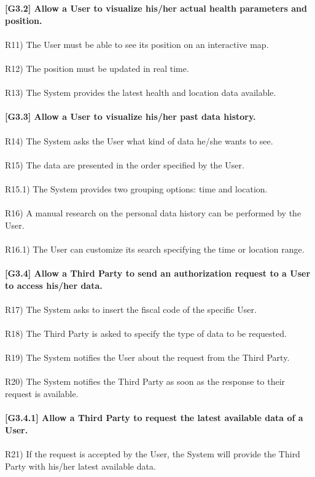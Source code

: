 \textbf{ [G3.2] Allow a User to visualize his/her actual health parameters and position.} \\ \\
R11) The User must be able to see its position on an interactive map. \\ \\
R12) The position must be updated in real time. \\ \\
R13) The System provides the latest health and location data available. \\ \\

\textbf{[G3.3] Allow a User to visualize his/her past data history.} \\ \\
R14) The System asks the User what kind of data he/she wants to see. \\ \\
R15) The data are presented in the order specified by the User.  \\ \\
R15.1) The System provides two grouping options: time and location. \\ \\
R16) A manual research on the personal data history can be performed by the User. \\ \\
R16.1) The User can customize its search specifying the time or location range. \\ \\ 

\textbf{[G3.4] Allow a Third Party to send an authorization request to a User to access his/her data.} \\ \\
R17) The System asks to insert the fiscal code of the specific User. \\ \\
R18) The Third Party is asked to specify the type of data to be requested.\\ \\ 
R19) The System notifies the User about the request from the Third Party.\\ \\
R20) The System notifies the Third Party as soon as the response to their request is available. \\ \\

\textbf{[G3.4.1] Allow a Third Party to request the latest available data of a User.} \\ \\
R21) If the request is accepted by the User, the System will provide the Third Party with his/her latest available data. \\ \\ 


